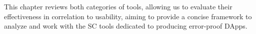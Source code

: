 \documentclass[oneside]{ecsproject}     %
\newcommand{\lref}[1]{Listing~\ref{#1}}
\begin{document}
This chapter reviews both categories of tools, allowing us to evaluate their effectiveness in correlation to usability,
aiming to provide a concise framework to analyze and work with the SC tools dedicated to producing
error-proof DApps. 





\end{document}

